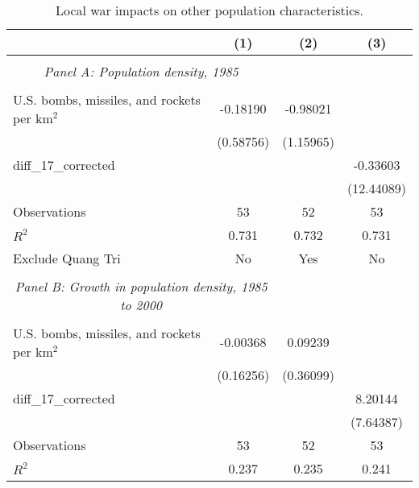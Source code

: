 \begin{table}[htbp]\centering \\ \def\sym#1{\ifmmode^{#1}\else\(^{#1}\)\fi} \\ \caption{Local war impacts on other population characteristics.} \\ \begin{tabular}{l*{3}{c}} \hline\hline
                    &\multicolumn{1}{c}{(1)}         &\multicolumn{1}{c}{(2)}         &\multicolumn{1}{c}{(3)}         \\
\hline \\ \multicolumn{2}{c}{\emph{Panel A: Population density, 1985}} \\\\[-1ex]
U.S. bombs, missiles, and rockets per km$^2$&    -0.18190         &    -0.98021         &                     \\
                    &   (0.58756)         &   (1.15965)         &                     \\
[1em]
diff\_17\_corrected   &                     &                     &    -0.33603         \\
                    &                     &                     &  (12.44089)         \\
\hline
Observations        &          53         &          52         &          53         \\
\(R^{2}\)           &       0.731         &       0.732         &       0.731         \\
Exclude Quang Tri   &          No         &         Yes         &          No         \\
\hline \\ \multicolumn{2}{c}{\emph{Panel B: Growth in population density, 1985 to 2000}} \\\\[-1ex]
U.S. bombs, missiles, and rockets per km$^2$&    -0.00368         &     0.09239         &                     \\
                    &   (0.16256)         &   (0.36099)         &                     \\
[1em]
diff\_17\_corrected   &                     &                     &     8.20144         \\
                    &                     &                     &   (7.64387)         \\
\hline
Observations        &          53         &          52         &          53         \\
\(R^{2}\)           &       0.237         &       0.235         &       0.241         \\

\end{tabular}
\end{table}
